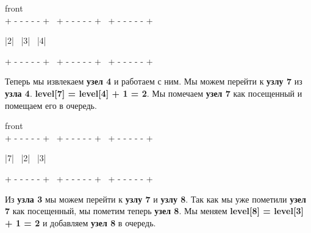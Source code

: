 \begin{tcolorbox}
\hspace{3.35cm}front \\
{\tiny{+ - - - - - +} \ \tiny{+ - - - - - +} \ \tiny{+ - - - - - +}}

\hspace{0.4mm}|\hspace{4.2mm}2\hspace{4.2mm}| \ |\hspace{4.2mm}3\hspace{4.2mm}| \ |\hspace{4mm}4\hspace{4mm}|

{\tiny{+ - - - - - +} \ \tiny{+ - - - - - +} \ \tiny{+ - - - - - +}}
\end{tcolorbox}

\vspace{\baselineskip}

Теперь мы извлекаем \textbf{узел 4} и работаем с ним. Мы можем перейти к \textbf{узлу 7} из \textbf{узла 4}. \textbf{level[7] = level[4] + 1 = 2}. Мы помечаем \textbf{узел 7} как посещенный и помещаем его в очередь.

\vspace{\baselineskip}

\begin{tcolorbox}
\hspace{3.35cm}front \\
{\tiny{+ - - - - - +} \ \tiny{+ - - - - - +} \ \tiny{+ - - - - - +}}

\hspace{0.4mm}|\hspace{4.2mm}7\hspace{4.2mm}| \ |\hspace{4.2mm}2\hspace{4.2mm}| \ |\hspace{4mm}3\hspace{4mm}|

{\tiny{+ - - - - - +} \ \tiny{+ - - - - - +} \ \tiny{+ - - - - - +}}
\end{tcolorbox}

\vspace{\baselineskip}

Из \textbf{узла 3} мы можем перейти к \textbf{узлу 7} и \textbf{узлу 8}. Так как мы уже пометили \textbf{узел 7} как посещенный, мы пометим теперь \textbf{узел 8}. Мы меняем \textbf{level[8] = level[3] + 1 = 2} и добавляем \textbf{узел 8} в очередь.

